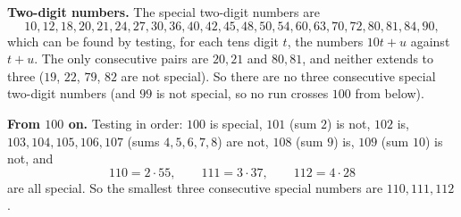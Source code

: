 \textbf{Two-digit numbers.} The special two-digit numbers are
\[
10,12,18,20,21,24,27,30,36,40,42,45,48,50,54,60,63,70,72,80,81,84,90,
\]
which can be found by testing, for each tens digit $t$, the numbers $10t+u$ against $t+u$. The only consecutive pairs are $20,21$ and $80,81$, and neither extends to three ($19$, $22$, $79$, $82$ are not special). So there are no three consecutive special two-digit numbers (and $99$ is not special, so no run crosses $100$ from below).

\textbf{From $100$ on.} Testing in order: $100$ is special, $101$ (sum $2$) is not, $102$ is, $103,104,105,106,107$ (sums $4,5,6,7,8$) are not, $108$ (sum $9$) is, $109$ (sum $10$) is not, and
\[
110=2\cdot55,\qquad 111=3\cdot37,\qquad 112=4\cdot28
\]
are all special. So the smallest three consecutive special numbers are $\boxed{110,111,112}$.
